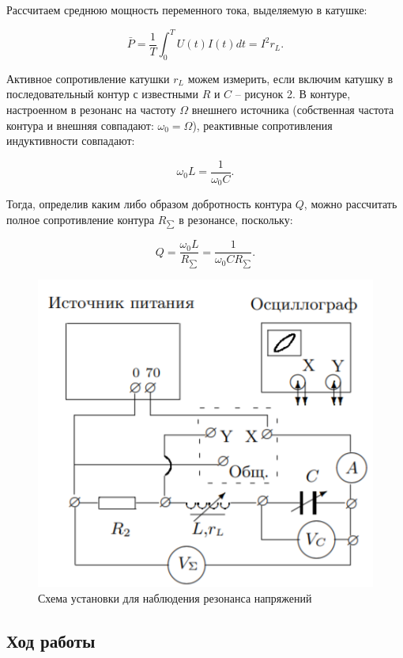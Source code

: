 \documentclass[a4paper, fontsize = 14pt]{article}
\begin{document}
Рассчитаем среднюю мощность переменного тока, выделяемую в катушке:

\begin{equation}
	\bar P = \frac{1}{T} \int_0^T U(t) I(t) dt = I^2 r_L. 
\end{equation}

Активное сопротивление катушки $r_L$ можем измерить, если включим катушку в последовательный контур с известными $R$ и $C$ -- рисунок 2. В контуре, настроенном в резонанс на частоту $\Omega$ внешнего источника (собственная частота контура и внешняя совпадают: $\omega_0 = \Omega$), реактивные сопротивления индуктивности совпадают:

\begin{equation}
	\omega_0 L = \frac{1}{\omega_0 C}. 
\end{equation}

Тогда, определив каким либо образом добротность контура $Q$, можно рассчитать полное сопротивление контура $R_{\sum}$ в резонансе, поскольку:

\begin{equation}
	Q = \frac{\omega_0 L}{R_{\sum}} = \frac{1}{\omega_0 C R_{
	\sum}}. 
\end{equation}

\begin{figure}[hbt]
	\centering
	\includegraphics[scale=0.8]{lab48ris2.png}
	\caption{Схема установки для наблюдения резонанса напряжений}
\end{figure}

\subsection*{Ход работы}
\end{document}
